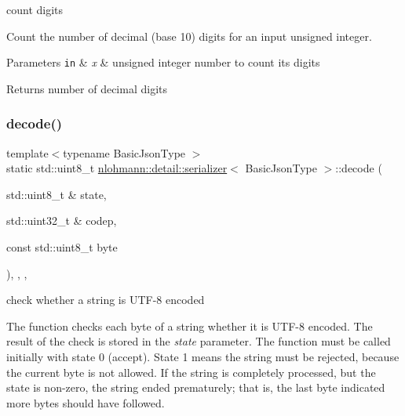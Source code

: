 count digits 

Count the number of decimal (base 10) digits for an input unsigned integer.


\begin{DoxyParams}[1]{Parameters}
\mbox{\tt in}  & {\em x} & unsigned integer number to count its digits \\
\hline
\end{DoxyParams}
\begin{DoxyReturn}{Returns}
number of decimal digits 
\end{DoxyReturn}
\mbox{\label{classnlohmann_1_1detail_1_1serializer_abdcc4fd1dc5d3afb6c0817e4c89b1242}} 
\subsubsection{\texorpdfstring{decode()}{decode()}}
{\footnotesize\ttfamily template$<$typename Basic\+Json\+Type $>$ \\
static std\+::uint8\+\_\+t \hyperlink{classnlohmann_1_1detail_1_1serializer}{nlohmann\+::detail\+::serializer}$<$ Basic\+Json\+Type $>$\+::decode (\begin{DoxyParamCaption}\item[{std\+::uint8\+\_\+t \&}]{state,  }\item[{std\+::uint32\+\_\+t \&}]{codep,  }\item[{const std\+::uint8\+\_\+t}]{byte }\end{DoxyParamCaption})\hspace{0.3cm}{\ttfamily [inline]}, {\ttfamily [static]}, {\ttfamily [private]}, {\ttfamily [noexcept]}}



check whether a string is U\+T\+F-\/8 encoded 

The function checks each byte of a string whether it is U\+T\+F-\/8 encoded. The result of the check is stored in the {\itshape state} parameter. The function must be called initially with state 0 (accept). State 1 means the string must be rejected, because the current byte is not allowed. If the string is completely processed, but the state is non-\/zero, the string ended prematurely; that is, the last byte indicated more bytes should have followed.


